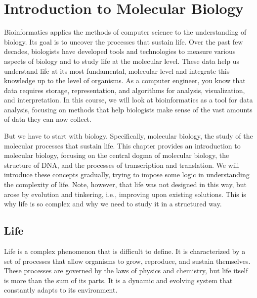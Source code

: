 \chapter{Introduction to Molecular Biology}
\label{ch:intro-mol-biol}

Bioinformatics 
applies the methods of computer science to the understanding of biology. 
Its goal is to uncover the processes that sustain life. Over the past few decades, biologists have developed tools and technologies to measure various aspects of biology and to study life at the molecular level. These data help us understand life at its most fundamental, molecular level and integrate this knowledge up to the level of organisms. As a computer engineer, you know that data requires storage, representation, and algorithms for analysis, visualization, and interpretation. In this course, we will look at bioinformatics as a tool for data analysis, focusing on methods that help biologists make sense of the vast amounts of data they can now collect.

But we have to start with biology. Specifically, molecular biology, the study of the molecular processes that sustain life. This chapter provides an introduction to molecular biology, focusing on the central dogma of molecular biology, the structure of DNA, and the processes of transcription and translation. We will introduce these concepts gradually, trying to impose some logic in understanding the complexity of life. Note, however, that life was not designed in this way, but arose by evolution and tinkering, i.e., improving upon existing solutions. This is why life is so complex and why we need to study it in a structured way.

\section{Life}

Life is a complex phenomenon
that is difficult to define. It is characterized by a set of processes that allow organisms to grow, reproduce, and sustain themselves. These processes are governed by the laws of physics and chemistry, but life itself is more than the sum of its parts. It is a dynamic and evolving system that constantly adapts to its environment.

